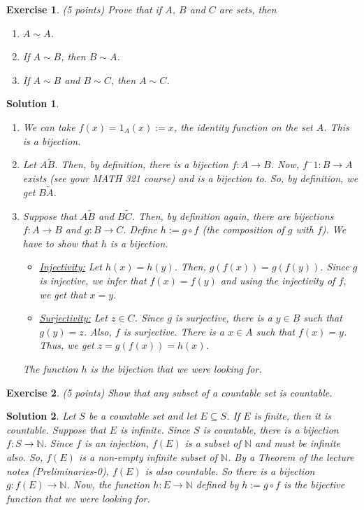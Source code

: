 \documentclass[12pt]{article}
\newcommand{\bN}{\mathbb{N}}
\newcommand{\ra}{\rightarrow}
\theoremstyle{plain}
\newtheorem{exer}{\textbf{Exercise}}}
\theoremstyle{plain}
\newtheorem*{sol}{\textbf{Solution}}}
\theoremstyle{plain}
\theoremstyle{plain}
\begin{document}
\begin{exer}
(5 points)
Prove that if $A$, $B$ and $C$ are sets, then
	\begin{enumerate}[label=\textbf{\alph*)}]
	\item $A \sim A$.
	\item If $A \sim B$, then $B \sim A$.
	\item If $A \sim B$ and $B \sim C$, then $A \sim C$.
	\end{enumerate}
\end{exer}
\begin{sol}
\begin{enumerate}
\item We can take $f(x) = 1_A (x) := x$, the identity function on the set $A$. This is a bijection.
\item Let $A \tilde B$. Then, by definition, there is a bijection $f : A \ra B$. Now, $f^-1: B \ra A$ exists (see your MATH 321 course) and is a bijection to. So, by definition, we get $B \tilde A$.
\item Suppose that $A \tilde B$ and $B \tilde C$. Then, by definition again, there are bijections $f : A \ra B$ and $g: B \ra C$. Define $h := g \circ f$ (the composition of $g$ with $f$). We have to show that $h$ is a bijection.
	\begin{itemize}
	\item \underline{Injectivity:} Let $h (x) = h(y)$. Then, $g(f(x)) = g(f(y))$. Since $g$ is injective, we infer that $f(x) = f(y)$ and using the injectivity of $f$, we get that $x = y$.
	\item \underline{Surjectivity:} Let $z \in C$. Since $g$ is surjective, there is a $y \in B$ such that $g(y) = z$. Also, $f$ is surjective. There is a $x \in A$ such that $f(x) = y$. Thus, we get $z = g(f(x)) = h(x)$.
	\end{itemize}
The function $h$ is the bijection that we were looking for. 
\end{enumerate}
\end{sol}

\begin{exer}
(5 points)
Show that any subset of a countable set is countable.
\end{exer}
\begin{sol}
Let $S$ be a countable set and let $E \subseteq S$. If $E$ is finite, then it is countable. Suppose that $E$ is infinite. Since $S$ is countable, there is a bijection $f: S \ra \bN$. Since $f$ is an injection, $f(E)$ is a subset of $\bN$ and must be infinite also. So, $f(E)$ is a non-empty infinite subset of $\bN$. By a Theorem of the lecture notes (Preliminaries-0), $f(E)$ is also countable. So there is a bijection $g : f(E) \ra \bN$. Now, the function $h : E \ra \bN$ defined by $h := g \circ f$ is the bijective function that we were looking for.
\end{sol}
\end{document}
